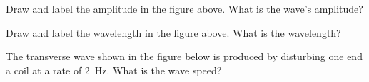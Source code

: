 \documentclass[]{exam}
\begin{document}
\begin{questions}

\question \label{Q1}
Draw and label the amplitude in the figure above. What is the wave's amplitude? \fillin[\SI{4}{m}][3cm]


\question \label{Q2}
Draw and label the wavelength in the figure above. What is the wavelength? \fillin[\SI{8}{m}][3cm]







\question 
The transverse wave shown in the figure below is produced by disturbing one end a coil at a rate of \SI{2}{Hz}. What is the wave speed?

\begin{center}
\end{center}


\end{questions}
\end{document}
